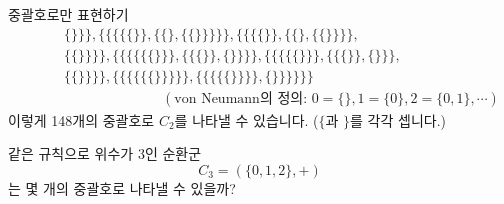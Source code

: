 \documentclass[serif]{beamer}
\begin{document}
\begin{frame}{중괄호로만 표현하기}
\[\begin{aligned}
            &\phantom{=}\quad\{\}\}\},\{\{\{\{\{\}\},\{\{\},\{\{\}\}\}\}\},\{\{\{\{\}\},\{\{\},\{\{\}\}\}\},\\
            &\phantom{=}\quad\{\{\}\}\}\},\{\{\{\{\{\{\}\}\},\{\{\{\}\},\{\}\}\}\},\{\{\{\{\{\}\}\},\{\{\{\}\},\{\}\}\},\\
            &\phantom{=}\quad\{\{\}\}\}\},\{\{\{\{\{\{\}\}\}\}\},\{\{\{\{\{\}\}\}\},\{\}\}\}\}\}\}\\
            &\phantom{=}\quad\quad\quad\quad\quad\quad\quad\quad(\text{von Neumann의 정의: }0=\{\},1=\{0\},2=\{0,1\},\cdots)
        \end{aligned}
    \]
    이렇게 148개의 중괄호로 $C_2$를 나타낼 수 있습니다. ($\{$과 $\}$를 각각 셉니다.)
\end{frame}

\begin{frame}{}
    \begin{hint}[문제]
        같은 규칙으로 위수가 $3$인 순환군
        \[
            C_3=(\{0,1,2\},+)
        \]
        는 몇 개의 중괄호로 나타낼 수 있을까?
    \end{hint}
\end{frame}
\end{document}
